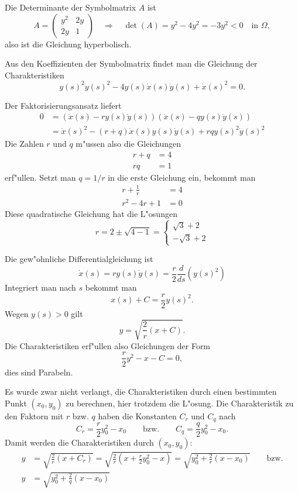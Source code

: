 \begin{loesung}
\begin{teilaufgaben}
\item
Die Determinante der Symbolmatrix $A$ ist
\[
A=\begin{pmatrix}
y^2&2y\\
2y&1
\end{pmatrix}
\quad\Rightarrow\quad
\det (A)=y^2-4y^2=-3y^2<0 \quad\text{in $\Omega$},
\]
also ist die Gleichung hyperbolisch.
\item
Aus den Koeffizienten der Symbolmatrix findet man die Gleichung
der Charakteristiken
\[
y(s)^2\dot y(s)^2-4y(s)\dot x(s)\dot y(s)+\dot x(s)^2=0.
\]
\item
Der Faktorisierungsansatz liefert
\begin{align*}
0&=(\dot x(s)-ry(s)\dot y(s))(\dot x(s)-qy(s)\dot y(s))
\\
&=\dot x(s)^2-(r+q)\dot x(s) y(s)\dot y(s)+rqy(s)^2\dot y(s)^2
\end{align*}
Die Zahlen $r$ und $q$ m"ussen also die Gleichungen
\begin{align*}
r+q&=4\\
rq&=1
\end{align*}
erf"ullen. Setzt man $q=1/r$ in die erste Gleichung ein, bekommt man
\begin{align*}
r+\frac1r&=4\\
r^2-4r+1&=0
\end{align*}
Diese quadratische Gleichung hat die L"osungen
\[
r
=
2\pm\sqrt{4-1}
=
\begin{cases}
\sqrt{3}+2\\
-\sqrt{3}+2
\end{cases}
\]
\item
Die gew"ohnliche Differentialgleichung ist
\[
\dot x(s)=ry(s)\dot y(s)=\frac{r}{2}\frac{d}{ds}(y(s)^2)
\]
Integriert man nach $s$ bekommt man
\[
x(s) + C=\frac{r}{2}y(s)^2.
\]
Wegen $y(s)>0$ gilt
\[
y = \sqrt{\frac{2}{r}(x+C)}.
\]
Die Charakteristiken erf"ullen also Gleichungen der Form
\[
\frac{r}2y^2-x-C=0,
\]
dies sind Parabeln.
\end{teilaufgaben}
Es wurde zwar nicht verlangt, die Charakteristiken durch einen
bestimmten Punkt $(x_0,y_0)$ zu berechnen, hier trotzdem die
L"osung. Die Charakteristik zu den Faktorn mit $r$ bzw. $q$ haben
die Konstanten $C_r$ und $C_q$ nach
\[
C_r=\frac{r}{2}y_0^2-x_0
\qquad
\text{bzw.}
\qquad
C_q=\frac{q}{2}y_0^2-x_0.
\]
Damit werden die Charakteristiken durch $(x_0,y_0)$:
\begin{align*}
y&=\sqrt{
\frac2r(x+C_r)
}
=
\sqrt{
\frac2r(x+
\frac{r}{2}y_0^2-x
)
}
=\sqrt{y_0^2+\frac2r(x-x_0)}
\qquad\text{bzw.}
\\
y&
=\sqrt{y_0^2+\frac2q(x-x_0)}
\end{align*}
\end{loesung}
